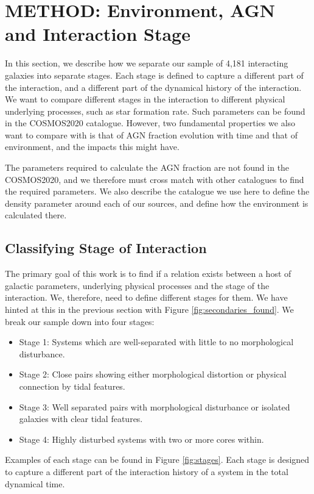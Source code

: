 \documentclass[fleqn,usenatbib]{mnras}
\begin{document}
\section{METHOD: Environment, AGN and Interaction Stage} \label{method}
In this section, we describe how we separate our sample of 4,181 interacting galaxies into separate stages. Each stage is defined to capture a different part of the interaction, and a different part of the dynamical history of the interaction. We want to compare different stages in the interaction to different physical underlying processes, such as star formation rate. Such parameters can be found in the COSMOS2020 catalogue. However, two fundamental properties we also want to compare with is that of AGN fraction evolution with time and that of environment, and the impacts this might have.

The parameters required to calculate the AGN fraction are not found in the COSMOS2020, and we therefore must cross match with other catalogues to find the required parameters. We also describe the catalogue we use here to define the density parameter around each of our sources, and define how the environment is calculated there.

\subsection{Classifying Stage of Interaction}\label{sec:staging}
The primary goal of this work is to find if a relation exists between a host of galactic parameters, underlying physical processes and the stage of the interaction. We, therefore, need to define different stages for them. We have hinted at this in the previous section with Figure \ref{fig:secondaries_found}. We break our sample down into four stages:

\begin{itemize}
    \item Stage 1: Systems which are well-separated with little to no morphological disturbance.
    \item Stage 2: Close pairs showing either morphological distortion or physical connection by tidal features.
    \item Stage 3: Well separated pairs with morphological disturbance or isolated galaxies with clear tidal features.
    \item Stage 4: Highly disturbed systems with two or more cores within.
\end{itemize}

\noindent Examples of each stage can be found in Figure \ref{fig:stages}. Each stage is designed to capture a different part of the interaction history of a system in the total dynamical time.
\end{document}
